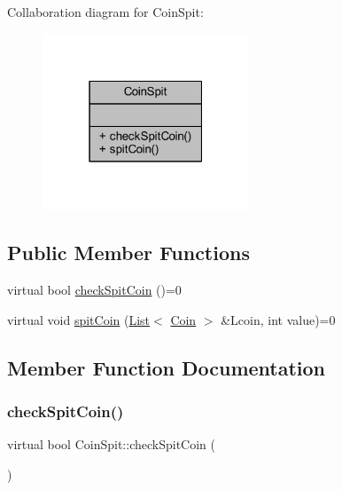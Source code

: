 Collaboration diagram for Coin\+Spit\+:
\nopagebreak
\begin{figure}[H]
\begin{center}
\leavevmode
\includegraphics[width=175pt]{class_coin_spit__coll__graph}
\end{center}
\end{figure}
\subsection*{Public Member Functions}
\begin{DoxyCompactItemize}
\item 
virtual bool \mbox{\hyperlink{class_coin_spit_a9471108f825dc67a35ac1a35444b84fd}{check\+Spit\+Coin}} ()=0
\item 
virtual void \mbox{\hyperlink{class_coin_spit_a336f45a90c4b0b57017b45a5c68f12a7}{spit\+Coin}} (\mbox{\hyperlink{class_list}{List}}$<$ \mbox{\hyperlink{class_coin}{Coin}} $>$ \&Lcoin, int value)=0
\end{DoxyCompactItemize}


\subsection{Member Function Documentation}
\mbox{\label{class_coin_spit_a9471108f825dc67a35ac1a35444b84fd}} 
\subsubsection{\texorpdfstring{check\+Spit\+Coin()}{checkSpitCoin()}}
{\footnotesize\ttfamily virtual bool Coin\+Spit\+::check\+Spit\+Coin (\begin{DoxyParamCaption}{ }\end{DoxyParamCaption})\hspace{0.3cm}{\ttfamily [pure virtual]}}



